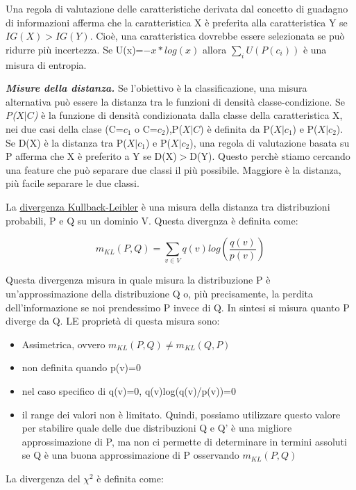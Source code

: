 \documentclass[a4paper]{extarticle}
\begin{document}
Una regola di valutazione delle caratteristiche derivata dal concetto di guadagno di informazioni afferma che la caratteristica X è preferita alla caratteristica Y se $IG(X)>IG(Y)$. Cioè, una caratteristica dovrebbe essere selezionata se può ridurre più incertezza. Se U(x)=$-x*log(x)$ allora $\sum_{i}U(P(c_i))$ è una misura di entropia.

\textbf{\textit{Misure della distanza.}} Se l'obiettivo è la classificazione, una misura alternativa può essere la distanza tra le funzioni di densità classe-condizione. Se \textit{P($X|C$)} è la funzione di densità condizionata dalla classe della caratteristica X, nei due casi della clase (C=$c_1$ o C=$c_2$),P($X|C$) è definita da P($X|c_1$) e P($X|c_2$). Se D(X) è la distanza tra P($X|c_1$) e P($X|c_2$), una regola di valutazione basata su P afferma che X è preferito a Y se D(X)$>$D(Y). Questo perchè stiamo cercando una feature che può separare due classi il più possibile. Maggiore è la distanza, più facile separare le due classi.

La \underline{divergenza Kullback-Leibler} è una misura della distanza tra distribuzioni probabili, P e Q su un dominio V. Questa divergnza è definita come:

\begin{equation}
m_{KL}(P,Q)= \sum_{v\in V} q(v)log(\dfrac {q(v)}{p(v)})
\end{equation}

Questa divergenza misura in quale misura la distribuzione P è un'approssimazione della distribuzione Q o, più precisamente, la perdita dell'informazione se noi prendessimo P invece di Q. In sintesi si misura quanto P diverge da Q. LE proprietà di questa misura sono:

\begin{itemize}
\item Assimetrica, ovvero $m_{KL}(P,Q) \not = m_{KL}(Q,P)$
\item non definita quando p(v)=0
\item nel caso specifico di q(v)=0, q(v)log(q(v)/p(v))=0
\item il range dei valori non è limitato. Quindi, possiamo utilizzare questo valore per stabilire quale delle due distribuzioni Q e Q' è una migliore approssimazione di P, ma non ci permette di determinare in termini assoluti se Q è una buona approssimazione di P osservando $m_{KL}(P,Q)$
\end{itemize} 

La divergenza del $\chi ^2$ è definita come:
\end{document}
